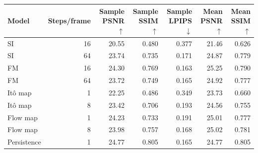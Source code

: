\begin{tabular}{lrrrrrr}
\toprule
Model & Steps/frame & Sample PSNR$\uparrow$ & Sample SSIM$\uparrow$ & Sample LPIPS$\downarrow$ & Mean PSNR$\uparrow$ & Mean SSIM$\uparrow$ \\
\midrule
SI & 16 & 20.55 & 0.480 & 0.377 & 21.46 & 0.626 \\
SI & 64 & 23.74 & 0.735 & 0.171 & 24.87 & 0.779 \\
FM & 16 & 24.30 & 0.769 & 0.163 & 25.25 & 0.790 \\
FM & 64 & 23.72 & 0.749 & 0.165 & 24.92 & 0.777 \\
It\^o map & 1 & 22.25 & 0.486 & 0.349 & 23.73 & 0.660 \\
It\^o map & 8 & 23.42 & 0.706 & 0.193 & 24.56 & 0.755 \\
Flow map & 1 & 24.23 & 0.733 & 0.191 & 25.01 & 0.777 \\
Flow map & 8 & 23.98 & 0.757 & 0.168 & 25.02 & 0.781 \\
Persistence & 1 & 24.77 & 0.805 & 0.165 & 24.77 & 0.805 \\
\bottomrule
\end{tabular}
